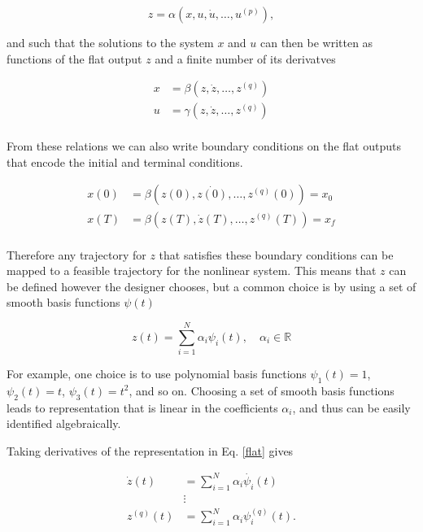 \documentclass[twoside]{article}
\begin{document}
\begin{equation}
z = \alpha (x,u,\dot{u},\dots,u^{(p)}),
\end{equation}

and such that the solutions to the system $x$ and $u$ can then be written as functions of the flat output $z$ and a finite number of its derivatves

\begin{equation}
\begin{split}
x &= \beta (z,\dot{z},\dots,z^{(q)}) \\
u &= \gamma (z,\dot{z},\dots,z^{(q)}) \\
\end{split}
\end{equation}

From these relations we can also write boundary conditions on the flat outputs that encode the initial and terminal conditions.

\begin{equation} \label{flatbc}
\begin{split}
x(0) &= \beta (z(0),\dot{z(0)},\dots,z^{(q)}(0)) = x_0 \\
x(T) &= \beta (z(T),\dot{z}(T),\dots,z^{(q)}(T)) = x_f \\
\end{split}
\end{equation}

Therefore any trajectory for $z$ that satisfies these boundary conditions can be mapped to a feasible trajectory for the nonlinear system. This means that $z$ can be defined however the designer chooses, but a common choice is by using a set of smooth basis functions $\psi(t)$

\begin{equation} \label{flat}
z(t) = \sum_{i=1}^{N} \alpha_i \psi_i(t), \quad \alpha_i \in \mathbb{R}
\end{equation}

For example, one choice is to use polynomial basis functions $\psi_1(t) = 1$, $\psi_2(t) = t$, $\psi_3(t) = t^2$, and so on. Choosing a set of smooth basis functions leads to representation that is linear in the coefficients $\alpha_i$, and thus can be easily identified algebraically.

Taking derivatives of the representation in Eq. \ref{flat} gives

\begin{equation}
\begin{split}
\dot{z}(t) &= \sum_{i=1}^{N} \alpha_i \dot{\psi_i}(t) \\
&\vdots \\
z^{(q)}(t) &= \sum_{i=1}^{N} \alpha_i \psi_i^{(q)}(t). \\
\end{split}
\end{equation}
\end{document}
